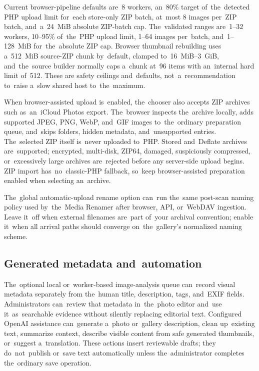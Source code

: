 \documentclass[11pt,a4paper]{article}
\begin{document}
Current browser-pipeline defaults are~8 workers, an~80\% target of~the~detected
PHP upload limit for~each store-only ZIP batch, at~most 8 images per~ZIP batch,
and~a~24~MiB absolute ZIP-batch cap. The~validated ranges are~1--32 workers,
10--95\% of~the~PHP upload limit, 1--64 images per~batch, and~1--128~MiB
for~the~absolute ZIP cap. Browser thumbnail rebuilding uses a~512~MiB source-ZIP
chunk by~default, clamped to~16~MiB--3~GiB, and~the~source builder normally caps
a~chunk at~96 items with an~internal hard limit of~512. These are safety
ceilings and~defaults, not~a~recommendation to~raise a~slow shared host
to~the~maximum.

When browser-assisted upload is~enabled, the~chooser also accepts ZIP archives
such as~an~iCloud Photos export. The~browser inspects the~archive locally, adds
supported JPEG, PNG, WebP, and~GIF images to~the~ordinary preparation queue,
and~skips folders, hidden metadata, and~unsupported entries. The~selected ZIP
itself is~never uploaded to~PHP. Stored and~Deflate archives are~supported;
encrypted, multi-disk, ZIP64, damaged, suspiciously compressed, or~excessively
large archives are~rejected before any server-side upload begins. ZIP import
has~no~classic-PHP fallback, so~keep browser-assisted preparation enabled when
selecting an~archive.

The~global automatic-upload rename option can~run the~same post-scan naming
policy used by~the~Media Renamer after browser, API, or~WebDAV ingestion. Leave
it~off when external filenames are~part of~your archival convention; enable
it~when all arrival paths should converge on~the~gallery's normalized naming
scheme.

\subsection{Generated metadata and~automation}

The~optional local or~worker-based image-analysis queue can~record visual
metadata separately from the~human title, description, tags, and~EXIF fields.
Administrators can~review that metadata in~the~photo editor and~use
it~as~searchable evidence without silently replacing editorial text. Configured
OpenAI assistance can~generate a~photo or~gallery description, clean up~existing
text, summarize context, describe visible content from safe generated
thumbnails, or~suggest a~translation. These actions insert reviewable drafts;
they do~not~publish or~save text automatically unless the~administrator
completes the~ordinary save operation.
\end{document}
